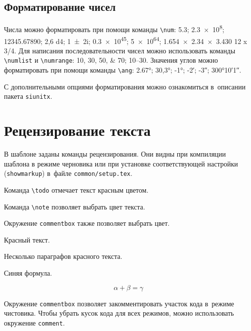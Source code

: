 \subsection{Форматирование чисел}\label{sec:units}

Числа можно форматировать при помощи команды \verb|\num|:
\num{5.3};
\num{2.3e8};
\num{12345,67890};
\num{2,6 d4};
\num{1+-2i};
\num{.3e45};
\num[exponent-base=2]{5 e64};
\num{1.654 x 2.34 x 3.430}
\num{12 x 3/4}.
Для написания последовательности чисел можно использовать команды \verb|\numlist| и \verb|\numrange|:
\numlist{10;30;50;70}; \numrange{10}{30}.
Значения углов можно форматировать при помощи команды \verb|\ang|:
\ang{2.67};
\ang{30,3};
\ang{-1;;};
\ang{;-2;};
\ang{;;-3};
\ang{300;10;1}.


С дополнительными опциями форматирования можно ознакомиться в~описании пакета \verb|siunitx|.


\section{Рецензирование текста}\label{sec:markup}

В шаблоне заданы команды рецензирования.
Они видны при компиляции шаблона в режиме черновика или при установке
соответствующей настройки (\verb+showmarkup+) в~файле \verb+common/setup.tex+.

Команда \verb+\todo+ отмечает текст красным цветом.

Команда \verb+\note+ позволяет выбрать цвет текста.
   

Окружение \verb+commentbox+ также позволяет выбрать цвет.

\begin{commentbox}[red]
    Красный текст.

    Несколько параграфов красного текста.
\end{commentbox}

\begin{commentbox}[blue]
    Синяя формула.

    \begin{equation}
        \alpha + \beta = \gamma
    \end{equation}
\end{commentbox}

Окружение \verb+commentbox+ позволяет закомментировать участок кода в~режиме чистовика.
Чтобы убрать кусок кода для всех режимов, можно использовать окружение \verb+comment+.

\FloatBarrier
